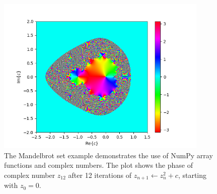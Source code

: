 \begin{enumerate}
\begin{figure}
\includegraphics[width=0.9\textwidth]{ch02/figures/mystery.png}
\caption{The Mandelbrot set example demonstrates the use of NumPy array functions and complex numbers. The plot
  shows the phase of complex number $z_{12}$ after 12 iterations of
  $z_{n+1} \leftarrow z_n^2 + c$, starting with $z_0 = 0$.}
\label{fig:mandelbrot}
\end{figure}



\end{enumerate}
